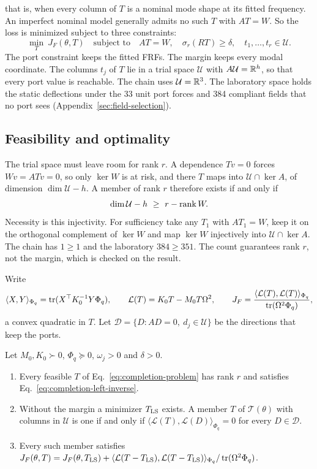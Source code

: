 that is, when every column of $T$ is a nominal mode shape at its fitted
frequency. An imperfect nominal model generally admits no such $T$ with
$AT=W$. So the loss is minimized subject to three constraints:
\begin{equation}
 \boxed{\ \min_{T}\ J_F(\theta,T)\quad\text{subject to}\quad
 AT=W,\quad\sigma_r(RT)\ge\delta,\quad t_1,\ldots,t_r\in\mathcal U.\ }
 \label{eq:completion-problem}
\end{equation}
The port constraint keeps the fitted FRFs. The margin keeps every modal
coordinate. The columns $t_j$ of $T$ lie in a trial space $\mathcal U$ with
$A\mathcal U=\mathbb R^h$, so that every port value is reachable. The chain uses
$\mathcal U=\mathbb R^3$. The laboratory space holds the static deflections under
the 33 unit port forces and 384 compliant fields that no port sees
(Appendix~\ref{sec:field-selection}).

\subsection{Feasibility and optimality}

The trial space must leave room for rank $r$. A dependence $Tv=0$ forces
$Wv=ATv=0$, so only $\ker W$ is at risk, and there $T$ maps into
$\mathcal U\cap\ker A$, of dimension $\dim\mathcal U-h$. A member of rank
$r$ therefore exists if and only if
\begin{equation}
 \dim\mathcal U-h\ \ge\ r-\operatorname{rank} W.
 \label{eq:rank-feasibility}
\end{equation}
Necessity is this injectivity. For sufficiency take any $T_1$ with
$AT_1=W$, keep it on the orthogonal complement of $\ker W$ and map
$\ker W$ injectively into $\mathcal U\cap\ker A$. The chain has $1\ge1$
and the laboratory $384\ge351$. The count guarantees rank $r$, not the
margin, which is checked on the result.

Write
\[
 \langle X,Y\rangle_{\Phi_q}=\operatorname{tr}(X^{\top}K_0^{-1}Y\Phi_q),\qquad
 \mathcal L(T)=K_0T-M_0T\Omega^2,\qquad
 J_F=\frac{\langle\mathcal L(T),\mathcal L(T)\rangle_{\Phi_q}}{\operatorname{tr}(\Omega^2\Phi_q)},
\]
a convex quadratic in $T$. Let $\mathcal D=\{D:AD=0,\ d_j\in\mathcal U\}$ be
the directions that keep the ports.

\begin{theorem}[Completion]\label{thm:completion}
Let $M_0,K_0\succ0$, $\Phi_q\succeq0$, $\omega_j>0$ and $\delta>0$.
\begin{enumerate}
\item[(i)] Every feasible $T$ of Eq.~\eqref{eq:completion-problem} has rank
$r$ and satisfies Eq.~\eqref{eq:completion-left-inverse}.
\item[(ii)] Without the margin a minimizer $T_{\rm LS}$ exists. A member $T$
of $\mathcal T(\theta)$ with columns in $\mathcal U$ is one if and only if
$\langle\mathcal L(T),\mathcal L(D)\rangle_{\Phi_q}=0$ for every
$D\in\mathcal D$.
\item[(iii)] Every such member satisfies
$J_F(\theta,T)=J_F(\theta,T_{\rm LS})
+\langle\mathcal L(T-T_{\rm LS}),\mathcal L(T-T_{\rm LS})\rangle_{\Phi_q}/\operatorname{tr}(\Omega^2\Phi_q)$.
\end{enumerate}
\end{theorem}

